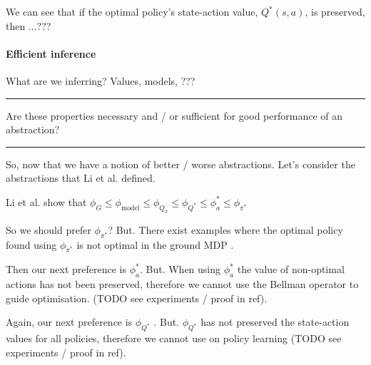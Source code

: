 We can see that if the optimal policy's state-action value, $Q^{* }(s, a)$, is preserved, then ...???

\paragraph{Efficient inference}

What are we inferring? Values, models, ???


\begin{center}\rule{0.5\linewidth}{\linethickness}\end{center}
  {\color{red}Are these properties necessary and / or sufficient for good performance of an abstraction?}
\begin{center}\rule{0.5\linewidth}{\linethickness}\end{center}

So, now that we have a notion of better / worse abstractions. Let's consider the abstractions
that Li et al. \cite{Littman2006} defined.

Li et al. \cite{Littman2006} show that $\phi_G \le \phi_{\text{model}} \le \phi_{Q_{\pi}} \le \phi_{Q^{* }} \le \phi_a^{* } \le \phi_{\pi^{* }}$

So we should prefer $\phi_{\pi^{* }}$? But. There exist examples where the
optimal policy found using $\phi_{\pi^{* }}$ is not optimal in the ground MDP \cite{Jong2005}.

Then our next preference is $\phi_a^{* }$. But. When using $\phi_a^{* }$ the value of non-optimal actions has not been preserved,
therefore we cannot use the Bellman operator to guide optimisation. ({\color{red}TODO} see experiments / proof in ref).

Again, our next preference is $\phi_{Q^{* }}$ .
But. $\phi_{Q^{* }}$ has not preserved the state-action values for all policies,
therefore we cannot use on policy learning ({\color{red}TODO} see experiments / proof in ref).




